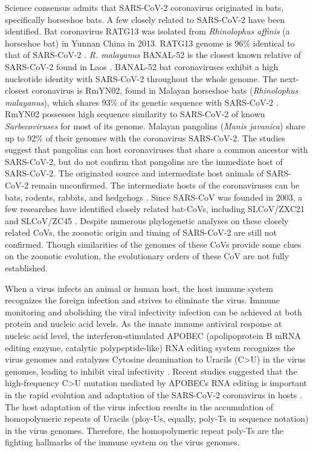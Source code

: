 \documentclass{article}
\numberwithin{equation}{section}
\begin{document}
Science consensus admits that SARS-CoV-2 coronavirus originated in bats, specifically horseshoe bats. A few closely related to SARS-CoV-2 have been identified. Bat coronavirus RATG13 was isolated from \textit{Rhinolophus affinis} (a horseshoe bat) in Yunnan China in 2013. RATG13 genome is 96\% identical to that of SARS-CoV-2 \cite{zhou2020pneumonia}. \textit{R. malayanus} BANAL-52 is the closest known relative of SARS-CoV-2 found in Laos \citep{temmam2021coronaviruses}. BANAL-52 bat coronaviruses exhibit a high nucleotide identity with SARS-CoV-2 throughout the whole genome. The next-closest coronavirus is RmYN02, found in Malayan horseshoe bats (\textit{Rhinolophus malayanus}), which shares 93\% of its genetic sequence with SARS-CoV-2 \citep{zhou2020novel}. RmYN02 possesses high sequence similarity to SARS-CoV-2 of known\textit{ Sarbecoviruses} for most of its genome. Malayan pangolins (\textit{Manis javanica}) share up to 92\% of their genomes with the coronavirus SARS-CoV-2. The studies suggest that pangolins can host coronaviruses that share a common ancestor with SARS-CoV-2, but do not confirm that pangolins are the immediate host of SARS-CoV-2. The originated source and intermediate host animals of SARS-CoV-2 remain unconfirmed. The intermediate hosts of the coronaviruses can be bats, rodents, rabbits, and hedgehogs \citep{monchatre2017identification}. Since SARS-CoV was founded in 2003, a few researches have identified closely related bat-CoVs, including SLCoV/ZXC21 and SLCoV/ZC45 \citep{hu2017discovery}. Despite numerous phylogenetic analyses on these closely related CoVs, the zoonotic origin and timing of SARS-CoV-2 are still not confirmed. Though similarities of the genomes of these CoVs provide some clues on the zoonotic evolution, the evolutionary orders of these CoV are not fully established.  

When a virus infects an animal or human host, the host immune system recognizes the foreign infection and strives to eliminate the virus. Immune monitoring and abolishing the viral infectivity infection can be achieved at both protein and nucleic acid levels. As the innate immune antiviral response at nucleic acid level, the interferon-stimulated APOBEC (apolipoprotein B mRNA editing enzyme, catalytic polypeptide-like) RNA editing system recognizes the virus genomes and catalyzes Cytosine deamination to Uracils (C>U) in the virus genomes, leading to inhibit viral infectivity \citep{bishop2004apobec}. Recent studies suggested that the high-frequency C>U mutation mediated by APOBECs RNA editing is important in the rapid evolution and adaptation of the SARS-CoV-2 coronavirus in hosts \citep{wang2020host,di2020evidence,matyavsek2020mutation}. The host adaptation of the virus infection results in the accumulation of homopolymeric repeats of Uracils (ploy-Us, equally, poly-Ts in sequence notation) in the virus genomes. Therefore, the homopolymeric repeat poly-Ts are the fighting hallmarks of the immune system on the virus genomes. 
\end{document}
